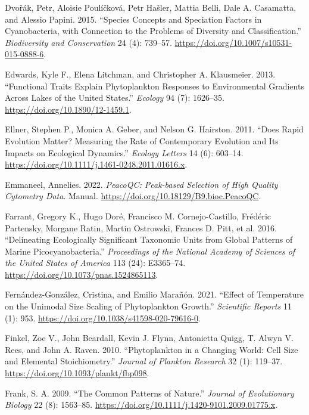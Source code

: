 \documentclass[
  letterpaper,
  DIV=11,
  numbers=noendperiod]{scrartcl}
\newlength{\cslhangindent}
\newenvironment{CSLReferences}[2] %
 {\begin{list}{}{%
  \setlength{\itemindent}{0pt}
  \setlength{\leftmargin}{0pt}
  \setlength{\parsep}{0pt}
  \ifodd #1
   \setlength{\leftmargin}{\cslhangindent}
   \setlength{\itemindent}{-1\cslhangindent}
  \fi
  \setlength{\itemsep}{#2\baselineskip}}}
 {\end{list}}
\begin{document}
\begin{CSLReferences}{1}{0}
Dvořák, Petr, Aloisie Poulíčková, Petr Hašler, Mattia Belli, Dale A.
Casamatta, and Alessio Papini. 2015. {``Species Concepts and Speciation
Factors in Cyanobacteria, with Connection to the Problems of Diversity
and Classification.''} \emph{Biodiversity and Conservation} 24 (4):
739--57. \url{https://doi.org/10.1007/s10531-015-0888-6}.

Edwards, Kyle F., Elena Litchman, and Christopher A. Klausmeier. 2013.
{``Functional Traits Explain Phytoplankton Responses to Environmental
Gradients Across Lakes of the {United States}.''} \emph{Ecology} 94 (7):
1626--35. \url{https://doi.org/10.1890/12-1459.1}.

Ellner, Stephen P., Monica A. Geber, and Nelson G. Hairston. 2011.
{``Does Rapid Evolution Matter? {Measuring} the Rate of Contemporary
Evolution and Its Impacts on Ecological Dynamics.''} \emph{Ecology
Letters} 14 (6): 603--14.
\url{https://doi.org/10.1111/j.1461-0248.2011.01616.x}.

Emmaneel, Annelies. 2022. \emph{{PeacoQC}: {Peak-based} Selection of
High Quality Cytometry Data}. Manual.
\url{https://doi.org/10.18129/B9.bioc.PeacoQC}.

Farrant, Gregory K., Hugo Doré, Francisco M. Cornejo-Castillo, Frédéric
Partensky, Morgane Ratin, Martin Ostrowski, Frances D. Pitt, et al.
2016. {``Delineating Ecologically Significant Taxonomic Units from
Global Patterns of Marine Picocyanobacteria.''} \emph{Proceedings of the
National Academy of Sciences of the United States of America} 113 (24):
E3365--74. \url{https://doi.org/10.1073/pnas.1524865113}.

Fernández-González, Cristina, and Emilio Marañón. 2021. {``Effect of
Temperature on the Unimodal Size Scaling of Phytoplankton Growth.''}
\emph{Scientific Reports} 11 (1): 953.
\url{https://doi.org/10.1038/s41598-020-79616-0}.

Finkel, Zoe V., John Beardall, Kevin J. Flynn, Antonietta Quigg, T.
Alwyn V. Rees, and John A. Raven. 2010. {``Phytoplankton in a Changing
World: {Cell} Size and Elemental Stoichiometry.''} \emph{Journal of
Plankton Research} 32 (1): 119--37.
\url{https://doi.org/10.1093/plankt/fbp098}.

Frank, S. A. 2009. {``The Common Patterns of Nature.''} \emph{Journal of
Evolutionary Biology} 22 (8): 1563--85.
\url{https://doi.org/10.1111/j.1420-9101.2009.01775.x}.


\end{CSLReferences}
\end{document}
